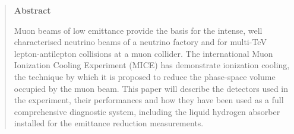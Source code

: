 \begin{quotation}
\begin{center}
\textbf{Abstract}
\end{center}

Muon beams of low emittance provide the basis for the intense, well characterised neutrino beams of a neutrino factory and for multi-TeV lepton-antilepton collisions at a muon collider. The international Muon Ionization Cooling Experiment (MICE) has demonstrate ionization cooling, the technique by which it is proposed to reduce the  phase-space volume occupied by the muon beam. This paper will describe the detectors used in the experiment, their performances and how they have been used as a full comprehensive diagnostic system, including the liquid hydrogen absorber installed for the emittance reduction measurements.

\end{quotation}



%
%       
